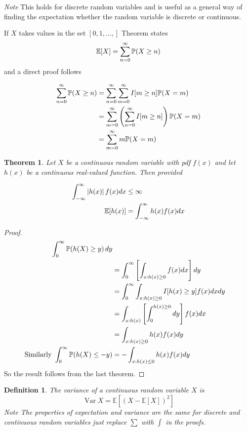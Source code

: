 \documentclass{notes}
\theoremstyle{plain}
\newtheorem{theorem}{Theorem}[chapter]
\newtheorem{definition}{Definition}[chapter]
\newcommand{\bP}{\mathbb{P}}
\newcommand{\bE}{\mathbb{E}}
\newcommand{\prob}[1]{\bP \negthinspace\left(#1\right)}
\newcommand{\expect}[1]{\bE\!\left[#1\right]}
\DeclareMathOperator{\var}{Var}
\begin{document}
\emph{Note} This holds for discrete random variables and is useful as
a general way of finding the expectation whether the random variable
is discrete or continuous.

If $X$ takes values in the set $[0,1,\dots,]$ Theorem states
\[
\expect{X} = \sum_{n=0}^\infty\prob{X \ge n}
\]
and a direct proof follows

\begin{align*}
\sum_{n=0}^\infty\prob{X \ge n} &=\sum_{n=0}^{\infty} \sum_{m=0}^{\infty}
I[m\ge n] \prob{X=m}\\
&= \sum_{m=0}^{\infty}\left(\sum_{n=0}^\infty I[m\ge n]\right)
\prob{X=m}\\
&=\sum_{m=0}^{\infty} m\prob{X=m}
\end{align*}

\begin{theorem}
Let $X$ be a continuous random variable with pdf $f(x)$ and let $h(x)$
be a continuous real-valued function. Then provided

\begin{align*}
\int_{-\infty}^{\infty}\abs{h(x)}f(x)dx & \le \infty\\
\expect{h(x)} &= \int_{-\infty}^{\infty}h(x)f(x)dx
\end{align*}
\end{theorem}

\begin{proof}
\begin{align*}
\int_{0}^{\infty}\prob{h(X) \ge y}dy\\
&=\int_{0}^{\infty}\left[\int_{x:h(x)\ge 0}f(x)dx \right]dy\\
&=\int_{0}^{\infty}\int_{x:h(x) \ge 0}I[h(x) \ge y] f(x)dxdy\\
&= \int_{x:h(x)}\left[\int_{0}^{h(x)\ge 0} dy\right] f(x) dx\\
&= \int_{x:h(x)\ge 0} h(x)f(x)dy\\
\text{Similarly } \int_{0}^{\infty}\prob{h(X) \le -y} &=
 -  \int_{x:h(x)\le 0} h(x)f(x)dy
\end{align*} 
So the result follows from the last theorem.
\end{proof}

\begin{definition}
The variance of a continuous random variable $X$ is
\[
\var{X} = \expect{(X-\expect{X})^2}
\]
\emph{Note} The properties of expectation and variance are the same
for discrete and continuous random variables just replace $\sum$ with
$\int$ in the proofs.
\end{definition}
\end{document}
